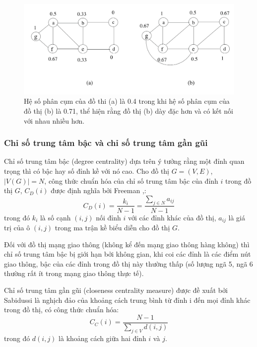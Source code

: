 \documentclass[14pt, oneside, a4paper, openany]{scrartcl}
\begin{document}
\begin{figure}[!h]
	\centering
	\includegraphics[scale=0.5]{figures/clustercoefficient.png} 
	\caption[Hệ số phân cụm]{Hệ số phân cụm của đồ thi (a) là 0.4 trong khi hệ số phân cụm của đồ thị (b) là 0.71, thể hiện rằng đồ thị (b) dày đặc hơn và có kết nối với nhau nhiều hơn.}
	\label{fig:clustercoeff}
\end{figure}

\subsubsection{Chỉ số trung tâm bậc và chỉ số trung tâm gần gũi}
Chỉ số trung tâm bậc (degree centrality) dựa trên ý tưởng rằng một đỉnh quan trọng thì có bậc hay số đỉnh kề với nó cao. Cho đồ thị $G=(V,E)$, $|V(G)| = N$, công thức chuẩn hóa của chỉ số trung tâm bậc của đỉnh $i$ trong đồ thị $G$, $C_D(i)$ được định nghĩa bởi Freeman \cite{centrali01},\cite{centrali02}:
\begin{equation}
C_D(i) = \frac{k_i}{N-1} = \frac{\sum_{j \in N}a_{ij}}{N-1}
\end{equation}
trong đó $k_i$ là số cạnh $(i,j)$ nối đỉnh $i$ với các đỉnh khác của đồ thị, $a_{ij}$ là giá trị của ô $(i,j)$ trong ma trận kề biểu diễn cho đồ thị $G$.

Đối với đồ thị mạng giao thông (không kể đến mạng giao thông hàng không) thì chỉ số trung tâm bậc bị giới hạn bởi không gian, khi coi các đỉnh là các điểm nút giao thông, bậc của các đỉnh trong đồ thị này thường thấp (số lượng ngã 5, ngã 6 thường rất ít trong mạng giao thông thực tế).

Chỉ số trung tâm gần gũi (closeness centrality measure) được đề xuất bởi Sabidussi \cite{centrali03} là nghịch đảo của khoảng cách trung bình từ đỉnh i đến mọi đỉnh khác trong đồ thị, có công thức chuẩn hóa:
\begin{equation}
C_C(i) = \frac{N-1}{\sum_{j \in V} d(i,j)}
\end{equation}
trong đó $d(i,j)$ là khoảng cách giữa hai đỉnh $i$ và $j$.
\end{document}
